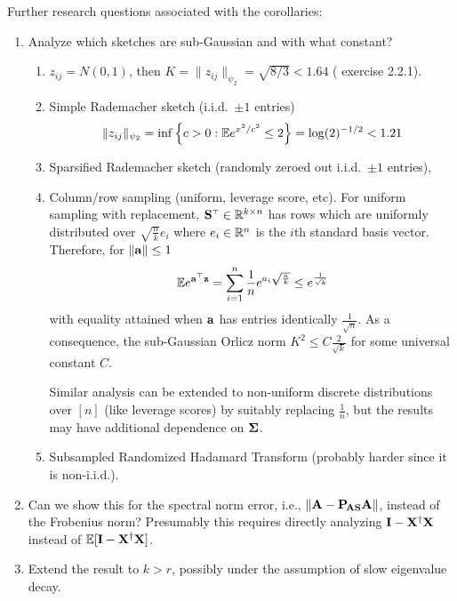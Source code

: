 \documentclass[11pt]{article}
\begin{document}
\noindent
Further research questions associated with the corollaries:
\begin{enumerate}
\item Analyze which sketches are sub-Gaussian and with what constant?
  \begin{enumerate}
    \item $z_{ij} = N(0,1)$, then $K = \|z_{ij}\|_{\psi_2} = \sqrt{8/3} < 1.64$
      (\cite{van1996weak} exercise 2.2.1).
  \item Simple Rademacher sketch (i.i.d.~$\pm1$ entries)
    \begin{align*}
      \|z_{ij}\|_{\psi_2} = 
      \inf \left\{ c > 0 : \mathbb E e^{x^2 / c^2} \leq 2\right\}
      = \log(2)^{-1/2} < 1.21
    \end{align*}
  \item Sparsified Rademacher sketch (randomly zeroed out i.i.d.~$\pm1$ entries),
  \item Column/row sampling (uniform, leverage score, etc). For uniform sampling
    with replacement, $\S^\top \in \R^{k \times n}$ has rows which
    are uniformly distributed over 
    $\sqrt{\frac{n}{k}} e_i$ where $e_i \in \mathbb R^n$ is the $i$th standard
    basis vector. Therefore,
    for $\|\mathbf a\| \leq 1$
    \begin{align*}
      \E e^{\a^\top \z}
      = \sum_{i=1}^n \frac{1}{n} e^{a_i \sqrt{\frac{n}{k}}}
      \leq e^{\frac{1}{\sqrt{k}}}
    \end{align*}
    with equality attained when $\mathbf a$ has entries identically 
    $\frac{1}{\sqrt{n}}$. As a consequence, the sub-Gaussian
    Orlicz norm $K^2 \leq C \frac{2}{\sqrt{k}}$
    for some universal constant $C$.

    Similar analysis can be extended to non-uniform discrete distributions
    over $[n]$ (like leverage scores) by suitably replacing $\frac{1}{n}$, but 
    the results may have additional dependence on $\mathbf{\Sigma}$.
  \item Subsampled Randomized Hadamard Transform (probably harder
    since it is non-i.i.d.).
  \end{enumerate}
  \item Can we show this for the spectral norm error, i.e.,
    $\|\mathbf A-\mathbf P_{\!\mathbf A\mathbf{S}}\mathbf A\|$,  instead of the Frobenius norm? Presumably this
    requires directly analyzing $\mathbf I-\mathbf X^\dagger\mathbf X$ instead of $\mathbb E[\mathbf I-\mathbf X^\dagger\mathbf X]$.
  \item Extend the result to $k>r$, possibly under the assumption of slow eigenvalue decay.
  \end{enumerate}
\end{document}
